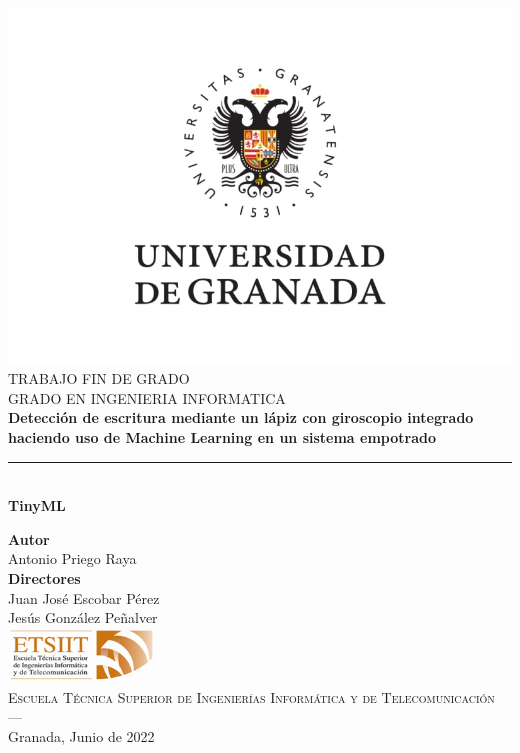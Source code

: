 \begin{titlepage}
\newlength{\centeroffset}
\setlength{\centeroffset}{-0.5\oddsidemargin}
\addtolength{\centeroffset}{0.5\evensidemargin}
\thispagestyle{empty}

\noindent\hspace*{\centeroffset}\begin{minipage}{\textwidth}

\centering
\includegraphics[width=1\textwidth]{logos/logo-ugr.jpg}\\[0,1cm]

\textsc{ \Large TRABAJO FIN DE GRADO\\[0.2cm]}
\textsc{ GRADO EN INGENIERIA INFORMATICA}\\[1cm]

{\LARGE\bfseries Detección de escritura mediante un lápiz con giroscopio
integrado haciendo uso de Machine Learning en un sistema empotrado \\}
\noindent\rule[-3ex]{\textwidth}{3pt}\\[3.5ex]
{\large\bfseries TinyML }
\end{minipage}

\vspace{2.5cm}
\noindent\hspace*{\centeroffset}
\begin{minipage}{\textwidth}
\centering

\textbf{Autor}\\ {Antonio Priego Raya}\\[2.5ex]
\textbf{Directores}\\ {Juan José Escobar Pérez\\Jesús González Peñalver}\\[2cm]
\includegraphics[width=0.3\textwidth]{logos/etsiit_logo.png}\\[0.1cm]
\textsc{Escuela Técnica Superior de Ingenierías Informática y de Telecomunicación}\\
\textsc{---}\\
Granada, Junio de 2022
\end{minipage}
\end{titlepage}
